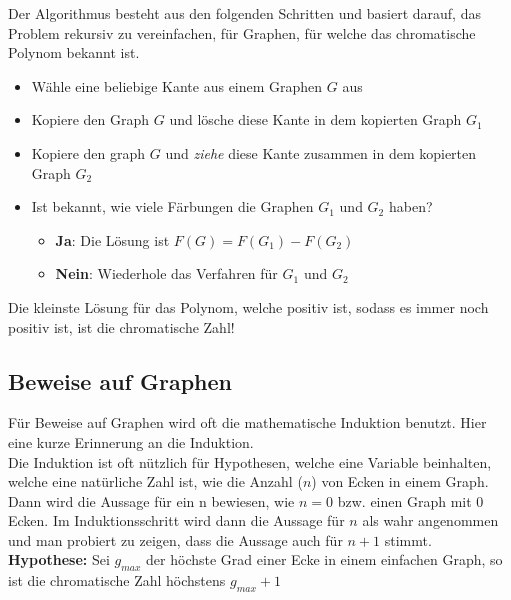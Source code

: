 \documentclass{article}
\begin{document}
Der Algorithmus besteht aus den folgenden Schritten und basiert darauf, das Problem rekursiv zu vereinfachen, für Graphen, für welche das chromatische Polynom bekannt ist.

\begin{itemize}
    \item Wähle eine beliebige Kante aus einem Graphen \(G\) aus
    \item Kopiere den Graph \(G\) und lösche diese Kante in dem kopierten Graph \(G_1\)
    \item Kopiere den graph \(G\) und \textit{ziehe} diese Kante zusammen in dem kopierten Graph \(G_2\)
    \item Ist bekannt, wie viele Färbungen die Graphen \(G_1\) und \(G_2\) haben?
    \begin{itemize}
      \item \textbf{Ja}: Die Lösung ist \(F(G)=F(G_1) - F(G_2)\)
      \item \textbf{Nein}: Wiederhole das Verfahren für \(G_1\) und \(G_2\)
    \end{itemize}
\end{itemize}

\noindent Die kleinste Lösung für das Polynom, welche positiv ist, sodass es immer noch positiv ist, ist die chromatische Zahl!

\subsection{Beweise auf Graphen}

Für Beweise auf Graphen wird oft die mathematische Induktion benutzt. Hier eine kurze Erinnerung an die Induktion. \\
\noindent Die Induktion ist oft nützlich für Hypothesen, welche eine Variable beinhalten, welche eine natürliche Zahl ist, wie die Anzahl (\(n\)) von Ecken in einem Graph. Dann wird die Aussage für ein n bewiesen, wie \(n=0\) bzw. einen Graph mit 0 Ecken. Im Induktionsschritt wird dann die Aussage für \(n\) als wahr angenommen und man probiert zu zeigen, dass die Aussage auch für \(n+1\) stimmt.\\

\noindent \textbf{Hypothese:} Sei \(g_{max}\) der höchste Grad einer Ecke in einem einfachen Graph, so ist die chromatische Zahl höchstens \(g_{max}+1\) \\
\end{document}

